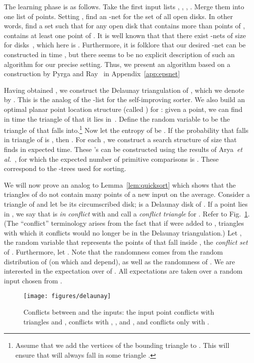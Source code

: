 \documentclass{siamltex}
\newcommand{\etal}{\emph{et al.}}
\begin{document}
The learning phase is as follows. Take the first
 input lists
, , , . 
Merge them into one list  
of  points. Setting , 
find an -net  for the set of all open disks. In 
other words, find a set  such that for any open disk  that
contains more than  points
of ,  contains at least one point of . 
It is well known that that there exist -nets of
size  for disks~\cite{CV,MSW,Matousek92,PyrgaRa08},
which here is .
Furthermore, it is folklore that 
our desired -net  can be constructed in time
, but there seems to
be no explicit description of such an algorithm 
for our precise setting. Thus, we present 
an algorithm based on a construction by
Pyrga and Ray~\cite{PyrgaRa08} in Appendix~\ref{app:epsnet}

Having obtained , we construct the Delaunay triangulation of ,
which we denote by . 
This is the analog of the -list for
the self-improving sorter.
We also build an optimal
planar point location structure (called ) for :
given a point, we can find in  time the triangle of  that
it lies in~\cite[Chapter~6]{deBergKrOvSc00}. Define the random variable 
 to be the triangle of  that  falls 
into.\footnote{Assume that we add the vertices of the bounding triangle to .
This will ensure that  will always fall in some triangle .}
Now let the entropy of  be .
If the probability that  falls in triangle  of  is ,
then . 
For each , we construct a search structure  of size 
that finds  in expected  time.
These 's can be constructed using 
the results of Arya~\etal~\cite{AMM}, for which the expected number
of primitive comparisons is .
These correspond to the -trees used
for sorting.

We will now prove an analog to
Lemma~\ref{lem:quicksort} which shows that the
triangles of  do not contain many points
of a new input  on the average. Consider
a triangle  of  and let  be its
circumscribed disk;  is a Delaunay disk of . If a point
 lies in , we say that  is \emph{in conflict}
with  and call  a \emph{conflict triangle} for .
Refer to Fig.~\ref{fig:conf}.
(The ``conflict'' terminology arises from the fact that if
 were added to , triangles with which it conflicts
would no longer be in the Delaunay triangulation.) 
Let
, the random variable that represents
the points of  that fall inside , the
\emph{conflict set} of . Furthermore, let
.
Note that the randomness comes from the random distribution
of  (on which  and  depend), as well as the randomness of .
We are interested in the expectation  over  of .
All expectations are taken over a random input  chosen
from .
\begin{figure}
\begin{center}
\texttt{[image: figures/delaunay]}
\end{center}
\caption{Conflicts between  and the inputs: the input point  conflicts with
triangles  and ,  conflicts with , , and ,
and  conflicts only with . } \label{fig:conf}
\end{figure}
\end{document}

